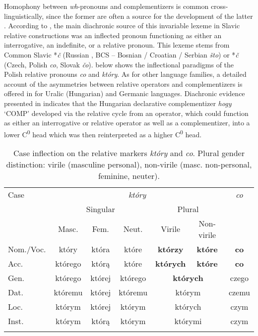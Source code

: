 \documentclass[output=paper]{langsci/langscibook}
\begin{document}
Homophony between \textit{wh}{}-pronouns and complementizers is common cross-linguistically, since the former are often a source for the development of the latter \citep[108]{Citko2004}. According to \citet{Minlos2012}, the main diachronic source of this invariable lexeme in Slavic relative constructions was an inflected pronoun functioning as either an interrogative, an indefinite, or a relative pronoun. This lexeme stems from Common Slavic *\textit{č }(Russian \textit{}, BCS – Bosnian / Croatian / Serbian \textit{što}) or *\textit{č }(Czech, Polish \textit{co}, Slovak \textit{čo}).  below shows the inflectional paradigms of the Polish relative pronouns \textit{co} and \textit{który}. As for other language families, a detailed account of the asymmetries between relative operators and complementizers is offered in \citet{Bacskai-Atkari2016} for Uralic (Hungarian) and Germanic languages. Diachronic evidence presented in \citet{Bacskai-Atkari2016} indicates that the Hungarian declarative complementizer \textit{hogy} ‘COMP’ developed via the relative cycle from an operator, which could function as either an interrogative or relative operator as well as a complementizer, into a lower C\textsuperscript{0} head which was then reinterpreted as a higher C\textsuperscript{0} head. 

\begin{table}
\caption{Case inflection on the relative markers \textit{który} and \textit{co}. Plural gender distinction: virile (masculine personal), non-virile (masc. non-personal, feminine, neuter).}
\begin{tabular}{l*{6}{c}}
\lsptoprule
Case & \multicolumn{5}{c}{\textit{który}} & \textit{co}\\\cmidrule(lr){2-6}
     & \multicolumn{3}{c}{Singular} & \multicolumn{2}{c}{Plural} & \\\cmidrule(lr){2-4}\cmidrule(lr){5-6}
     & Masc. & Fem. & Neut. & Virile & Non-virile & \\\midrule
Nom.\slash Voc. & który & która & które & \textbf{którzy} & \textbf{które} & \textbf{co}\\
Acc. & którego & którą & które & \textbf{których} & \textbf{które} & \textbf{co}\\
Gen. & którego & której & którego & \multicolumn{2}{c}{\textbf{których}} & czego\\
Dat. & któremu & której & któremu & \multicolumn{2}{c}{którym} & czemu\\
Loc. & którym & której & którym & \multicolumn{2}{c}{których} & czym\\
Inst. & którym & którą  & którym & \multicolumn{2}{c}{którymi} & czym\\
\lspbottomrule
\end{tabular}
\label{tab:leska:1}
\end{table}
\end{document}
